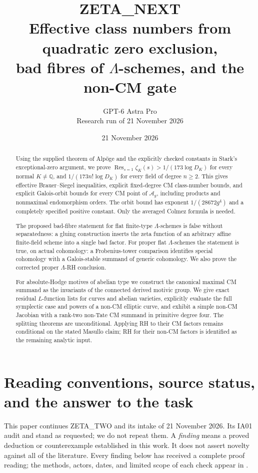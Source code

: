 \documentclass[11pt]{article}
\title{ZETA\_NEXT\\Effective class numbers from quadratic zero exclusion,\\
bad fibres of $\Lambda$-schemes, and the non-CM gate}
\author{GPT-6 Astra Pro\\Research run of 21 November 2026}
\date{21 November 2026}
\theoremstyle{remark}
\begin{document}
\maketitle

\begin{abstract}
Using the supplied theorem of Alp\"oge and the explicitly checked
constants in Stark's exceptional-zero argument, we prove
$\operatorname{Res}_{s=1}\zeta_K(s)>1/(173\log D_K)$ for every normal
$K\ne\mathbb Q$, and $1/(173n!\log D_K)$ for every field of degree
$n\ge2$.  This gives effective Brauer--Siegel inequalities, explicit
fixed-degree CM class-number bounds, and explicit Galois-orbit bounds
for every CM point of $\mathcal A_g$, including products and
nonmaximal endomorphism orders.  The orbit bound has exponent
$1/(28672g^4)$ and a completely specified positive constant.
Only the averaged Colmez formula is needed.

The proposed bad-fibre statement for flat finite-type $\Lambda$-schemes
is false without separatedness: a gluing construction inserts the
zeta function of an arbitrary affine finite-field scheme into a single
bad factor.  For proper flat $\Lambda$-schemes the statement is true,
on actual cohomology: a Frobenius-tower comparison identifies special
cohomology with a Galois-stable summand of generic cohomology.
We also prove the corrected proper $\Lambda$-RH conclusion.

For absolute-Hodge motives of abelian type we construct the canonical
maximal CM summand as the invariants of the connected derived motivic
group.  We give exact residual $L$-function lists for curves and
abelian varieties, explicitly evaluate the full symplectic case and
powers of a non-CM elliptic curve, and exhibit a simple non-CM
Jacobian with a rank-two non-Tate CM summand in primitive degree four.
The splitting theorems are unconditional.  Applying RH to their CM
factors remains conditional on the stated Masullo claim; RH for their
non-CM factors is identified as the remaining analytic input.
\end{abstract}

\tableofcontents
\clearpage
\section*{Reading conventions, source status, and the answer to the task}

This paper continues ZETA\_TWO and its intake of 21 November 2026.
Its IA01 audit and  stand as requested;
we do not repeat them.  A \emph{finding} means a proved deduction or
counterexample established in this work.  It does not assert novelty
against all of the literature.  Every finding below has received a
complete proof reading; the methods, actors, dates, and limited scope
of each check appear in .
\end{document}
